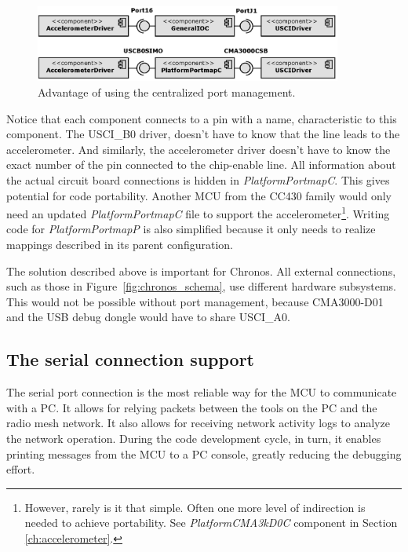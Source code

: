 \begin{figure}[h]
  \centering
  \includegraphics[width=0.9\textwidth]{diagrams/portmap_clairty.eps}
  \caption{Advantage of using the centralized port management.}
  \label{fig:}
\end{figure}
Notice that each component connects to a pin with a name, characteristic to this component. The USCI\_B0 driver, doesn't have to know that the line leads to the accelerometer. And similarly, the accelerometer driver doesn't have to know the exact number of the pin connected to the chip-enable line. All information about the actual circuit board connections is hidden in \emph{PlatformPortmapC}. This gives potential for code portability. Another MCU from the CC430 family would only need an updated \emph{PlatformPortmapC} file to support the accelerometer\footnote{However, rarely is it that simple. Often one more level of indirection is needed to achieve portability. See \emph{PlatformCMA3kD0C} component in Section \ref{ch:accelerometer}.}. Writing code for \emph{PlatformPortmapP} is also simplified because it only needs to realize mappings described in its parent configuration.

The solution described above is important for Chronos. All external connections, such as those in Figure~\ref{fig:chronos_schema}, use different hardware subsystems. This would not be possible without port management, because CMA3000-D01 and the USB debug dongle would have to share USCI\_A0.

\subsection{The serial connection support}


The serial port connection is the most reliable way for the MCU to communicate with a PC. It allows for relying packets between the tools on the PC and the radio mesh network. It also allows for receiving network activity logs to analyze the network operation. During the code development cycle, in turn, it enables printing messages from the MCU to a PC console, greatly reducing the debugging effort.

